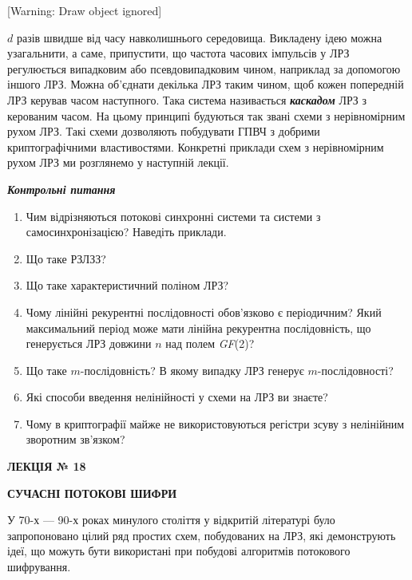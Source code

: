 [Warning: Draw object ignored] 

 $d$ разів швидше від часу навколишнього середовища. Викладену ідею можна
узагальнити, а саме, припустити, що частота часових імпульсів у ЛРЗ регулюється
випадковим або псевдовипадковим чином, наприклад за допомогою іншого ЛРЗ. Можна
об’єднати декілька ЛРЗ таким чином, щоб кожен попередній ЛРЗ керував часом
наступного. Така система називається \textbf{\textit{каскадом}}\textit{ }ЛРЗ з
керованим часом. На цьому принципі будуються так звані схеми з нерівномірним
рухом ЛРЗ. Такі схеми дозволяють побудувати ГПВЧ з добрими криптографічними
властивостями. Конкретні приклади схем з нерівномірним рухом ЛРЗ ми розглянемо
у наступній лекції.


\bigskip

{\centering\bfseries\itshape
Контрольні питання
\par}


\bigskip

\liststyleWWviiiNumlvi
\begin{enumerate}
\item Чим відрізняються потокові синхронні системи та системи з
самосинхронізацією? Наведіть приклади.
\item Що таке РЗЛЗЗ?
\item Що таке характеристичний поліном ЛРЗ?
\item Чому лінійні рекурентні послідовності обов’язково є періодичним? Який
максимальний період може мати лінійна рекурентна послідовність, що генерується
ЛРЗ довжини  $n$ над полем \textit{GF}(2)? 
\item Що таке  $m${}-послідовність? В якому випадку ЛРЗ генерує 
$m${}-послідовності?
\item Які способи введення нелінійності у схеми на ЛРЗ ви знаєте?
\item Чому в криптографії майже не використовуються регістри зсуву з нелінійним
зворотним зв’язком?
\end{enumerate}

\bigskip


\bigskip


\bigskip

{\bfseries
ЛЕКЦІЯ № 18}


\bigskip

{\centering\bfseries
СУЧАСНІ  ПОТОКОВІ  ШИФРИ
\par}


\bigskip


\bigskip

У 70-х --- 90-х роках минулого століття у відкритій літературі було запропоновано
цілий ряд простих схем, побудованих на ЛРЗ, які демонструють ідеї, що можуть
бути використані при побудові алгоритмів потокового шифрування.

